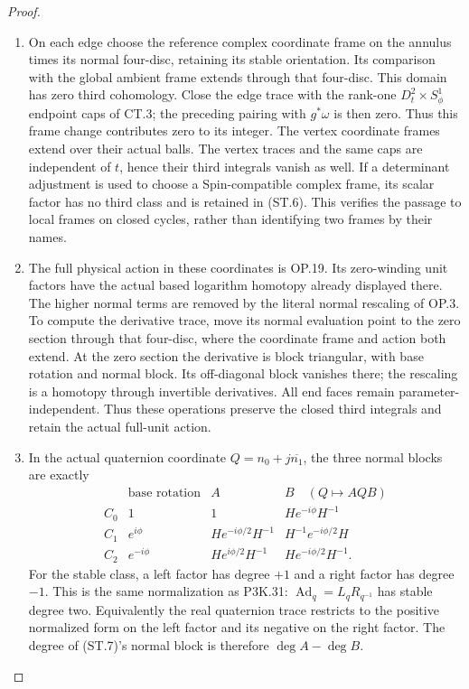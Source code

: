 \begin{proof}
\begin{enumerate}[label=\arabic*.]
\item On each edge choose the reference complex coordinate frame on the
annulus times its normal four-disc, retaining its stable orientation.
Its comparison with the global ambient frame extends through that
four-disc. This domain has zero third cohomology. Close the edge
trace with the rank-one \(D^2_t\times S^1_\phi\) endpoint caps of
CT.3; the preceding pairing with \(g^*\omega\) is then zero.
Thus this frame change contributes zero to its integer. The vertex
coordinate frames extend over their actual balls. The vertex traces
and the same caps are independent of \(t\), hence their third
integrals vanish as well. If a determinant adjustment is used to
choose a Spin-compatible complex frame, its scalar factor has no
third class and is retained in (ST.6). This verifies the passage to
local frames on closed cycles, rather than identifying two frames
by their names.

\item The full physical action in these coordinates is OP.19. Its
zero-winding unit factors have the actual based logarithm homotopy
already displayed there. The higher normal terms are removed by
the literal normal rescaling of OP.3. To compute the derivative
trace, move its normal evaluation point to the zero section through
that four-disc, where the coordinate frame and action both extend.
At the zero section the derivative is block triangular, with base
rotation and normal block. Its off-diagonal block vanishes there;
the rescaling is a homotopy through invertible derivatives. All end
faces remain parameter-independent. Thus these operations preserve
the closed third integrals and retain the actual full-unit action.

\item In the actual quaternion coordinate
\(Q=n_0+j\overline{n_1}\), the three normal blocks are exactly
\[
 \begin{array}{c|c|c|c}
 &\text{base rotation}& A& B\quad (Q\mapsto AQB)\\ \hline
 C_0&1&1&H e^{-i\phi}H^{-1}\\
 C_1&e^{i\phi}&H e^{-i\phi/2}H^{-1}&H^{-1}e^{-i\phi/2}H\\
 C_2&e^{-i\phi}&H e^{i\phi/2}H^{-1}&H e^{-i\phi/2}H^{-1}.
 \end{array}                                             \tag{ST.7}
\]
For the stable class, a left factor has degree \(+1\) and a right
factor has degree \(-1\). This is the same normalization as
P3K.31: \(\operatorname{Ad}_q=L_qR_{q^{-1}}\) has stable degree
two. Equivalently the real quaternion trace restricts to the
positive normalized form on the left factor and its negative on
the right factor. The degree of (ST.7)'s normal block is therefore
\(\deg A-\deg B\).


\end{enumerate}
\end{proof}
